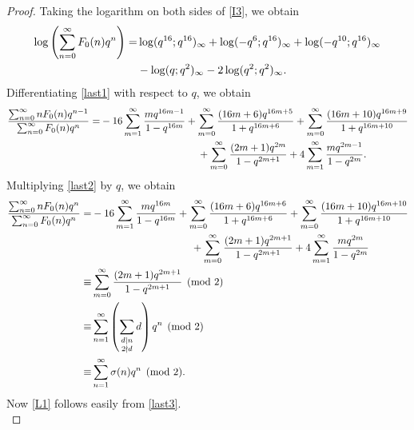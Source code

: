 \documentclass[12pt]{article}
\numberwithin{equation}{section}
\theoremstyle{definition}
\theoremstyle{remark}
\numberwithin{equation}{section}
\begin{document}
\begin{proof}
Taking the logarithm on both sides of \eqref{I3}, we obtain
\begin{align}
\log\left(\sum_{n=0}^{\infty}F_0(n)q^n\right)
=&
\log(q^{16};q^{16})_{\infty}
+\log(-q^6;q^{16})_{\infty}
+\log(-q^{10};q^{16})_{\infty} \notag\\
&\label{last1}-\log(q;q^2)_{\infty}
-2\log(q^2;q^2)_{\infty}.
\end{align}
Differentiating \eqref{last1} with respect to $q$, we obtain
\begin{align}
\dfrac{\sum_{n=0}^{\infty}nF_0(n)q^{n-1}}{\sum_{n=0}^{\infty}F_0(n)q^n}
=&
-16\sum_{m=1}^{\infty}\dfrac{mq^{16m-1}}{1-q^{16m}}
+\sum_{m=0}^{\infty}\dfrac{(16m+6)q^{16m+5}}{1+q^{16m+6}} 
+\sum_{m=0}^{\infty}\dfrac{(16m+10)q^{16m+9}}{1+q^{16m+10}}\notag\\
&\label{last2}\hspace{3.4cm}+\sum_{m=0}^{\infty}\dfrac{(2m+1)q^{2m}}{1-q^{2m+1}} 
+4\sum_{m=1}^{\infty}\dfrac{mq^{2m-1}}{1-q^{2m}}.
\end{align}
Multiplying  \eqref{last2} by $q$, we obtain
\begin{align}
\dfrac{\sum_{n=0}^{\infty}nF_0(n)q^{n}}{\sum_{n=0}^{\infty}F_0(n)q^n}
=&
-16\sum_{m=1}^{\infty}\dfrac{mq^{16m}}{1-q^{16m}}
+\sum_{m=0}^{\infty}\dfrac{(16m+6)q^{16m+6}}{1+q^{16m+6}} 
+\sum_{m=0}^{\infty}\dfrac{(16m+10)q^{16m+10}}{1+q^{16m+10}}\notag\\
&\hspace{3.4cm}+\sum_{m=0}^{\infty}\dfrac{(2m+1)q^{2m+1}}{1-q^{2m+1}} 
+4\sum_{m=1}^{\infty}\dfrac{mq^{2m}}{1-q^{2m}}\notag\\
\equiv&
\sum_{m=0}^{\infty}\dfrac{(2m+1)q^{2m+1}}{1-q^{2m+1}}
\pmod 2\notag\\
\equiv&
\sum_{n=1}^{\infty}\left(\sum_{\substack{d\mid n\\2\nmid d}}d\right)q^n\pmod2\notag\\
\equiv&\label{last3}\sum_{n=1}^{\infty}\sigma(n)q^n\pmod2.
\end{align}
Now  \eqref{L1} follows easily from \eqref{last3}.\\


\end{proof}
\end{document}
